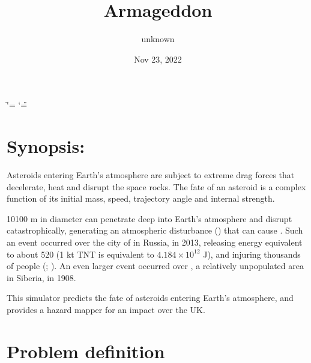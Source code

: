 \documentclass[letterpaper,10pt,english]{sphinxmanual}
\title{Armageddon}
\date{Nov 23, 2022}
\author{unknown}
\begin{document}
\ifdefined\shorthandoff
  \ifnum\catcode`\=\string=\active\shorthandoff{=}\fi
  \ifnum\catcode`\"=\active{}\fi
\fi

\pagestyle{empty}
\sphinxmaketitle
\pagestyle{plain}
\sphinxtableofcontents
\pagestyle{normal}
\label{\detokenize{index::doc}}



\chapter{Synopsis:}
\label{\detokenize{index:synopsis}}
\sphinxAtStartPar
Asteroids entering Earth’s atmosphere are subject to extreme drag forces
that decelerate, heat and disrupt the space rocks. The fate of an
asteroid is a complex function of its initial mass, speed, trajectory
angle and internal strength.

\sphinxAtStartPar
{} 10\sphinxhyphen{}100 m in
diameter can penetrate deep into Earth’s atmosphere and disrupt
catastrophically, generating an atmospheric disturbance
() that can cause
.
Such an event occurred over the city of
 in
Russia, in 2013, releasing energy equivalent to about 520  (1 kt TNT is
equivalent to \(4.184 \times 10^{12}\) J), and injuring thousands of
people (; ). An even larger event
occurred over
, a
relatively unpopulated area in Siberia, in 1908.

\sphinxAtStartPar
This simulator predicts the fate of asteroids entering Earth’s atmosphere,
and provides a hazard mapper for an impact over the UK.


\chapter{Problem definition}
\label{\detokenize{index:problem-definition}}
\end{document}
